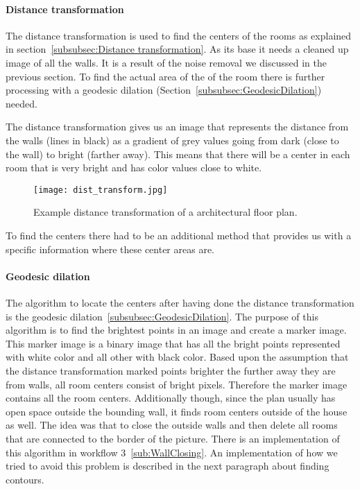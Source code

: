 \paragraph{Distance transformation}
\label{sub:DistanceTransformation}
The distance transformation is used to find the centers of the rooms as explained in section~\ref{subsubsec:Distance transformation}. As its base it needs a cleaned up image of all the walls. It is a result of the noise removal we discussed in the previous section. To find the actual area of the of the room there is further processing with a geodesic dilation (Section~\ref{subsubsec:GeodesicDilation}) needed.

The distance transformation gives us an image that represents the distance from the walls (lines in black) as a gradient of grey values going from dark (close to the wall) to bright (farther away). This means that there will be a center in each room that is very bright and has color values close to white.

\begin{figure}[H]
	\centering
	\texttt{[image: dist\_transform.jpg]}
	\caption{Example distance transformation of a architectural floor plan.}
	\label{fig:dist_transform}
\end{figure}

To find the centers there had to be an additional method that provides us with a specific information where these center areas are.

\paragraph{Geodesic dilation}
\label{sub:GeodesicDilation}
The algorithm to locate the centers after having done the distance transformation is the geodesic dilation~\ref{subsubsec:GeodesicDilation}. The purpose of this algorithm is to find the brightest points in an image and create a marker image. This marker image is a binary image that has all the bright points represented with white color and all other with black color. Based upon the assumption that the distance transformation marked points brighter the further away they are from walls, all room centers consist of bright pixels. Therefore the marker image contains all the room centers. Additionally though, since the plan usually has open space outside the bounding wall, it finds room centers outside of the house as well. The idea was that to close the outside walls and then delete all rooms that are connected to the border of the picture. There is an implementation of this algorithm in workflow 3~\ref{sub:WallClosing}. An implementation of how we tried to avoid this problem is described in the next paragraph about finding contours.

